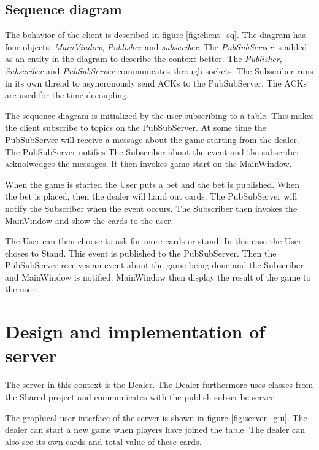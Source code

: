 \FloatBarrier

\subsection{Sequence diagram}
The behavior of the client is described in figure \ref{fig:client_sq}. The diagram has four objects: \emph{MainVindow}, \emph{Publisher} and \emph{subscriber}. The \emph{PubSubServer} is added as an entity in the diagram to describe the context better. The \emph{Publisher}, \emph{Subscriber} and \emph{PubSubServer} communicates through sockets. The Subscriber runs in its own thread to asyncronously send ACKs to the PubSubServer. The ACKs are used for the time decoupling. 

The sequence diagram is initialized by the user subscribing to a table. This makes the client subscribe to topics on the PubSubServer. At some time the PubSubServer will receive a message about the game starting from the dealer. The PubSubServer notifies The Subscriber about the event and the subscriber acknolwedges the messages. It then invokes game start on the MainWindow. 

When the game is started the User puts a bet and the bet is published. When the bet is placed, then the dealer will hand out cards. The PubSubServer will notify the Subscriber when the event occurs. The Subscriber then invokes the MainVindow and show the cards to the user. 

The User can then choose to ask for more cards or stand. In this case the User choses to Stand. This event is published to the PubSubServer. Then the PubSubServer receives an event about the game being done and the Subscriber and MainWindow is notified. MainWindow then display the result of the game to the user.

\FloatBarrier

\section{Design and implementation of server}
The server in this context is the Dealer. The Dealer furthermore uses classes from the Shared project and communicates with the publish subscribe server.

The graphical user interface of the server is shown in figure \ref{fig:server_gui}. The dealer can start a new game when players have joined the table. The dealer can also see its own cards and total value of these cards.  

